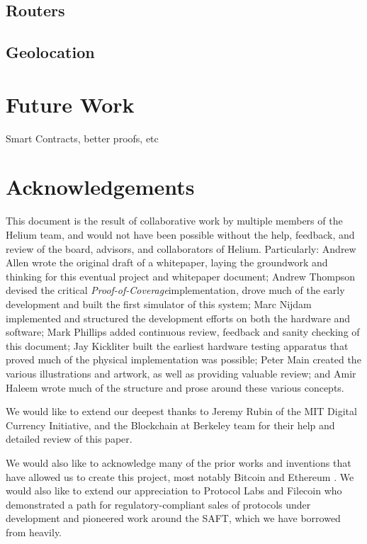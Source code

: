 \documentclass[letterpaper,11pt]{report}
\newcommand{\proofofcoverage}{\textit{Proof-of-Coverage}}
\begin{document}
\subsection{Routers}

\subsection{Geolocation}

\section{Future Work}

Smart Contracts, better proofs, etc

\newpage

\section{Acknowledgements}

This document is the result of collaborative work by multiple members of the Helium team, and would not have been possible without the help, feedback, and review of the board, advisors, and collaborators of Helium. Particularly: Andrew Allen wrote the original draft of a whitepaper, laying the groundwork and thinking for this eventual project and whitepaper document; Andrew Thompson devised the critical \proofofcoverage implementation, drove much of the early development and built the first simulator of this system; Marc Nijdam implemented and structured the development efforts on both the hardware and software; Mark Phillips added continuous review, feedback and sanity checking of this document; Jay Kickliter built the earliest hardware testing apparatus that proved much of the physical implementation was possible; Peter Main created the various illustrations and artwork, as well as providing valuable review; and Amir Haleem wrote much of the structure and prose around these various concepts.\newline

We would like to extend our deepest thanks to Jeremy Rubin of the MIT Digital Currency Initiative, and the Blockchain at Berkeley team for their help and detailed review of this paper.\newline

We would also like to acknowledge many of the prior works and inventions that have allowed us to create this project, most notably Bitcoin \cite{bitcoin} and Ethereum \cite{ethereum}. We would also like to extend our appreciation to Protocol Labs \cite{protocol} and Filecoin \cite{filecoin} who demonstrated a path for regulatory-compliant sales of protocols under development and pioneered work around the SAFT, which we have borrowed from heavily.
\newpage
\end{document}
